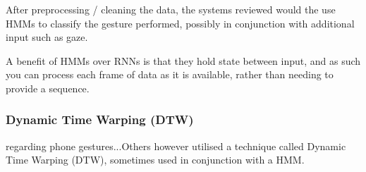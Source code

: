 After preprocessing / cleaning the data, the systems reviewed would the use HMMs\cite{neelasagar2015real} to classify the gesture performed, possibly in conjunction with additional input such as gaze\cite{kong2021eyemu}.

A benefit of HMMs over RNNs is that they hold state between input, and as such you can process each frame of data as it is available, rather than needing to provide a sequence.

\subsubsection{Dynamic Time Warping (DTW)}
regarding phone gestures...Others however utilised a technique called Dynamic Time Warping (DTW), sometimes used in conjunction with a HMM.
\nl







